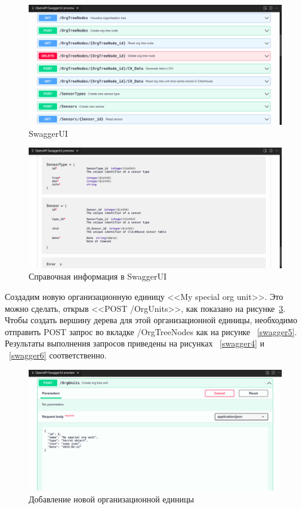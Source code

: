 \begin{figure}
    \includegraphics[scale=0.2]{img/swagger1.png}
    \caption{SwaggerUI}
    \label{swagger1}
\end{figure}

\begin{figure}
    \includegraphics[scale=0.2]{img/swagger2.png}
    \caption{Справочная информация в SwaggerUI}
    \label{swagger2}
\end{figure}

Создадим новую организационную единицу <<My special org unit>>. Это можно сделать, открыв <<POST /OrgUnits>>, как показано на рисунке~\ref{swagger3}. Чтобы создать вершину дерева для этой организационной единицы, необходимо отправить POST запрос во вкладке /OrgTreeNodes как на рисунке ~\ref{swagger5}. Результаты выполнения запросов приведены на рисунках ~\ref{swagger4} и ~\ref{swagger6} соответственно.

\begin{figure}
    \includegraphics[scale=0.2]{img/swagger3.png}
    \caption{Добавление новой организационной единицы}
    \label{swagger3}
\end{figure}


